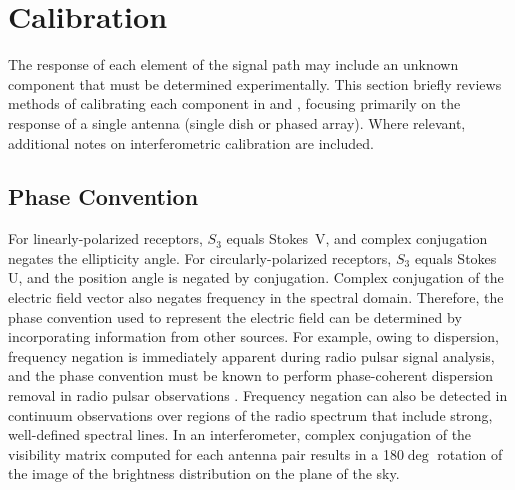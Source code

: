\section{ Calibration }
\label{sec:calibration}




The response of each element of the signal path may include an unknown component that must be determined experimentally.  
%
This section briefly reviews methods of calibrating
each component in  and ,
%
focusing primarily on the response of a single antenna (single dish or phased array).  
%
Where relevant, additional notes on interferometric calibration are included.


\subsection{ Phase Convention }
\label{sec:calibration_phase_convention}

For linearly-polarized receptors, $S_3$ equals Stokes~V, and complex conjugation
negates the ellipticity angle.
%
For circularly-polarized receptors, $S_3$ equals Stokes U, and the position 
angle is negated by conjugation.
%
%
Complex conjugation of the electric field vector
also negates frequency in the spectral domain.
%
Therefore, the phase convention used to represent the electric field can be determined by incorporating information from other sources.
%
For example, owing to dispersion, frequency negation is immediately apparent during radio pulsar signal analysis,
and the phase convention must be known to perform phase-coherent dispersion removal in radio pulsar observations \cite[e.g.,][]{vb11}.
%
Frequency negation can also be detected in continuum observations over regions of the radio spectrum that include strong, well-defined spectral lines.
%
In an interferometer, complex conjugation of the visibility matrix computed for each antenna pair results in a 180$\deg$ rotation of the image of the brightness distribution on the plane of the sky.

